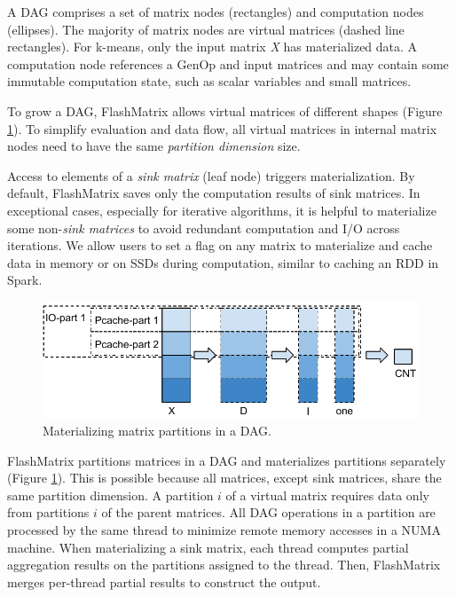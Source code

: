 
A DAG comprises a set of matrix nodes (rectangles)
and computation nodes (ellipses). The majority of matrix nodes are
virtual matrices (dashed line rectangles).
For k-means, only the input matrix \textit{X} has materialized data.
A computation node references a GenOp and input matrices and
may contain some immutable computation state, such as scalar variables and
small matrices. 

To grow a DAG, FlashMatrix allows virtual matrices of different shapes
(Figure \ref{fig:mater}). To simplify evaluation and data flow, 
all virtual matrices in internal matrix nodes need to have the same
\textit{partition dimension} size.

Access to elements of a \textit{sink matrix} (leaf node) triggers materialization.
By default, FlashMatrix saves only the computation results of sink matrices.
In exceptional cases, especially for iterative algorithms,
it is helpful to materialize some non-\textit{sink matrices} to avoid
redundant computation and I/O across iterations.  We allow users to
set a flag on any matrix to materialize and cache data in memory
or on SSDs during computation, similar to caching an RDD in Spark.

\begin{figure}
	\centering
	\includegraphics[scale=0.6]{FlashMatrix_figs/materialize.pdf}
  \vspace{-4pt}
	\caption{Materializing matrix partitions in a DAG.}
	\label{fig:mater}
  \vspace{-8pt}
\end{figure}

FlashMatrix partitions matrices in a DAG and
materializes partitions separately (Figure \ref{fig:mater}). 
This is possible
because all matrices, except sink matrices, share the same partition dimension. 
A partition $i$ of a virtual matrix requires data only from partitions
$i$ of the parent matrices.  All DAG operations in a partition are processed by 
the same thread to minimize remote memory accesses in a NUMA machine.
When materializing a sink matrix, each thread computes partial
aggregation results on the partitions assigned to the thread. 
Then, FlashMatrix merges per-thread partial results to construct the output.

